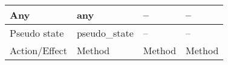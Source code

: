 \begin{table}[]
\begin{tabular}{llll}
		Any                                                        & any                                                                & --                                                                         & --                                                             \\ \hline
		Pseudo state                                               & pseudo\_state                                                      & --                                                                         & --                                                             \\ \hline
		Action/Effect                                              & Method                                                             & Method                                                                     & Method                                                         \\ %
	\end{tabular}
\end{table}